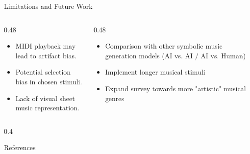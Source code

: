 \documentclass[final]{beamer}
\begin{document}
\begin{frame}[t]
  \vspace{-0.3em}

  \begin{block}{\hspace{0.5em}Limitations and Future Work}
    \vspace{-0.5em}
    \small
    \begin{columns}[t]
      \begin{column}{0.48\textwidth}
        \begin{itemize}
          \setlength\itemsep{0em}
          \item MIDI playback may lead to artifact bias.
          \item Potential selection bias in chosen stimuli.
          \item Lack of visual sheet music representation.
        \end{itemize}
      \end{column}
      \begin{column}{0.48\textwidth}
        \begin{itemize}
          \setlength\itemsep{0em}
          \item Comparison with other symbolic music generation models (AI vs. AI / AI vs. Human)
          \item Implement longer musical stimuli
          \item Expand survey towards more "artistic" musical genres
        \end{itemize}
      \end{column}
    \end{columns}
    \vspace{0.1em}
  \end{block}

  \vfill 
  \vspace{-1.8cm}
  \begin{columns}[t]

    \begin{column}{0.4\textwidth}
      \begin{block}{References}
        \vspace{0.5em}
        \printbibliography
      \end{block}
    \end{column}




\end{columns}
\end{frame}
\end{document}
